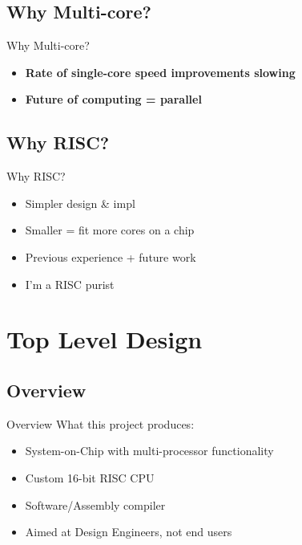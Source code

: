 \documentclass[aspectratio=169]{beamer}
\begin{document}
\subsection{Why Multi-core?}
\begin{frame}{Why Multi-core?}

\begin{itemize}\setlength\itemsep{1em}
    \item{\textbf{Rate of single-core speed improvements slowing}}
    \item{\textbf{Future of computing = parallel}}
\end{itemize}
\end{frame}

\subsection{Why RISC?}
\begin{frame}{Why RISC?}
\begin{itemize}\setlength\itemsep{1em}
    \item Simpler design \& impl
    \item Smaller = fit more cores on a chip
    \item Previous experience + future work
    \item I'm a RISC purist
\end{itemize}
\end{frame}

\section{Top Level Design}
\frame{\vspace{-1cm}
\tableofcontents[currentsection, subsectionstyle=show/show/hide]}

\subsection{Overview}
\begin{frame}{Overview}
What this project produces:
\begin{itemize}\setlength\itemsep{1em}
    \item{System-on-Chip with multi-processor functionality\\
    }
    
    \item{Custom 16-bit RISC CPU\\
    }
    
    \item{Software/Assembly compiler\\
    }
    
    \item{Aimed at Design Engineers, not end users\\
    }
\end{itemize}
\end{frame}
\end{document}
